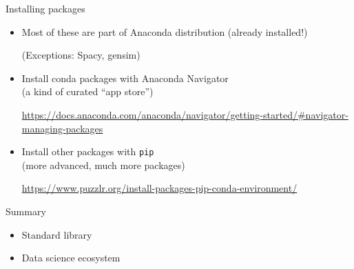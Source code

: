 \documentclass[aspectratio=169,usenames,dvipsnames]{beamer}
\begin{document}
\begin{frame}{Installing packages}
    \begin{itemize}
        \item Most of these are part of Anaconda distribution (already installed!)

			(Exceptions: Spacy, gensim)
        \item Install conda packages with Anaconda Navigator \\
			(a kind of curated ``app store'')

            \url{https://docs.anaconda.com/anaconda/navigator/getting-started/\#navigator-managing-packages}

        \item Install other packages with \texttt{pip} \\
			(more advanced, much more packages)

            \url{https://www.puzzlr.org/install-packages-pip-conda-environment/}
    \end{itemize}
\end{frame}


\begin{frame}{Summary}
    \begin{itemize}
        \item Standard library
        \item Data science ecosystem
    \end{itemize}
\end{frame}
\end{document}
